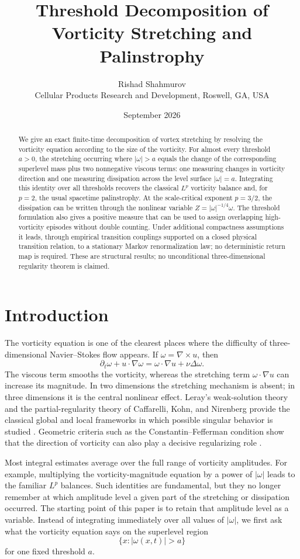 \documentclass[11pt]{article}
\title{\textbf{Threshold Decomposition of Vorticity Stretching and Palinstrophy}}
\author{Rishad Shahmurov\\\small Cellular Products Research and Development, Roswell, GA, USA}
\date{September 2026}
\theoremstyle{definition}\newtheorem{definition}[theorem]{Definition}
\theoremstyle{remark}\newtheorem{remark}[theorem]{Remark}
\begin{document}
\maketitle
\begin{abstract}
We give an exact finite-time decomposition of vortex stretching by resolving the vorticity equation according to the size of the vorticity.  For almost every threshold $a>0$, the stretching occurring where $|\omega|>a$ equals the change of the corresponding superlevel mass plus two nonnegative viscous terms: one measuring changes in vorticity direction and one measuring dissipation across the level surface $|\omega|=a$.  Integrating this identity over all thresholds recovers the classical $L^p$ vorticity balance and, for $p=2$, the usual spacetime palinstrophy.  At the scale-critical exponent $p=3/2$, the dissipation can be written through the nonlinear variable $Z=|\omega|^{-1/4}\omega$.  The threshold formulation also gives a positive measure that can be used to assign overlapping high-vorticity episodes without double counting.  Under additional compactness assumptions it leads, through empirical transition couplings supported on a closed physical transition relation, to a stationary Markov renormalization law; no deterministic return map is required.  These are structural results; no unconditional three-dimensional regularity theorem is claimed.
\end{abstract}

\section{Introduction}
The vorticity equation is one of the clearest places where the difficulty of three-dimensional Navier--Stokes flow appears.  If $\omega=\nabla\times u$, then
\[
\partial_t\omega+u\cdot\nabla\omega
=\omega\cdot\nabla u+\nu\Delta\omega.
\]
The viscous term smooths the vorticity, whereas the stretching term $\omega\cdot\nabla u$ can increase its magnitude.  In two dimensions the stretching mechanism is absent; in three dimensions it is the central nonlinear effect.  Leray's weak-solution theory and the partial-regularity theory of Caffarelli, Kohn, and Nirenberg provide the classical global and local frameworks in which possible singular behavior is studied \cite{Leray1934,CKN1982}.  Geometric criteria such as the Constantin--Fefferman condition show that the direction of vorticity can also play a decisive regularizing role \cite{ConstantinFefferman1993}.

Most integral estimates average over the full range of vorticity amplitudes.  For example, multiplying the vorticity-magnitude equation by a power of $|\omega|$ leads to the familiar $L^p$ balances.  Such identities are fundamental, but they no longer remember at which amplitude level a given part of the stretching or dissipation occurred.  The starting point of this paper is to retain that amplitude level as a variable.  Instead of integrating immediately over all values of $|\omega|$, we first ask what the vorticity equation says on the superlevel region
\[
\{x:|\omega(x,t)|>a\}
\]
for one fixed threshold $a$.
\end{document}

